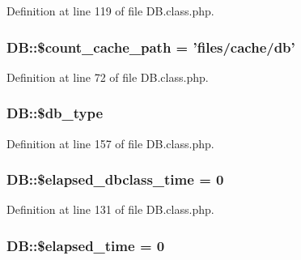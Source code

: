 Definition at line 119 of file D\+B.\+class.\+php.

\hypertarget{classDB_aca72b9b3a39bb5e5d2e444f20db2c6bb}{
\subsubsection[{\$count\+\_\+cache\+\_\+path}]{\setlength{\rightskip}{0pt plus 5cm}D\+B\+::\$count\+\_\+cache\+\_\+path = 'files/cache/db'}}\label{classDB_aca72b9b3a39bb5e5d2e444f20db2c6bb}


Definition at line 72 of file D\+B.\+class.\+php.

\hypertarget{classDB_a78868b4c2301aa813d9e2d481424f1e8}{
\subsubsection[{\$db\+\_\+type}]{\setlength{\rightskip}{0pt plus 5cm}D\+B\+::\$db\+\_\+type}}\label{classDB_a78868b4c2301aa813d9e2d481424f1e8}


Definition at line 157 of file D\+B.\+class.\+php.

\hypertarget{classDB_a0483c1bfe18fa5e8bbe7915f9c8187a7}{
\subsubsection[{\$elapsed\+\_\+dbclass\+\_\+time}]{\setlength{\rightskip}{0pt plus 5cm}D\+B\+::\$elapsed\+\_\+dbclass\+\_\+time = 0}}\label{classDB_a0483c1bfe18fa5e8bbe7915f9c8187a7}


Definition at line 131 of file D\+B.\+class.\+php.

\hypertarget{classDB_af5a3fdd4e0078a185dac8c2727fb4f2c}{
\subsubsection[{\$elapsed\+\_\+time}]{\setlength{\rightskip}{0pt plus 5cm}D\+B\+::\$elapsed\+\_\+time = 0}}\label{classDB_af5a3fdd4e0078a185dac8c2727fb4f2c}


